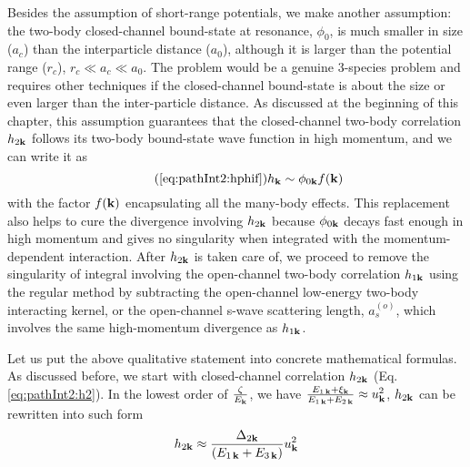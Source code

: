 Besides the assumption of short-range potentials, we make another assumption:  the  two-body closed-channel bound-state at resonance, $\phi_{0}$, is much smaller in size ($a_{c}$) than the interparticle distance ($a_{0}$), although it is  larger than the potential range ($r_{c}$),    $r_{c}\ll{}a_{c}\ll{}a_{0}$.  The problem would be a genuine 3-species problem and requires other techniques if the closed-channel bound-state is about the size  or even larger than the inter-particle distance. As discussed at the beginning of this chapter, this assumption guarantees that the closed-channel two-body correlation $h_{2\mathbf{k}}$ follows its two-body bound-state wave function in high momentum, and  we can write it as 
\begin{equation}\tag{\ref{eq:pathInt2:hphif}}
h_{\vk}\sim\phi_{0\vk}f(\vk)
\end{equation}
with the factor $f(\mathbf{k})$ encapsulating all the many-body effects. This replacement also helps to  cure the divergence involving $h_{2\mathbf{k}}$ because $\phi_{0\mathbf{k}}$ decays fast enough in high momentum and gives no singularity when integrated with the momentum-dependent interaction.   After $h_{2\mathbf{k}}$ is taken care of, we proceed to remove the singularity of integral involving the open-channel two-body correlation $h_{1\mathbf{k}}$ using the regular method by subtracting the open-channel low-energy two-body interacting kernel, or the open-channel s-wave scattering length, $a_{s}^{(o)}$, which involves  the same high-momentum divergence as $h_{1\mathbf{k}}$. 



Let us put the above qualitative statement into concrete mathematical formulas.   As discussed before, we start with  closed-channel correlation $h_{2\mathbf{k}}$ (Eq. \ref{eq:pathInt2:h2}). In the lowest order of $\frac{\zeta}{E_{\mathbf{k}}}$, we have $\frac{E_{1\,\mathbf{k}}+\xi_{\mathbf{k}}}{E_{1\,\mathbf{k}}+E_{2\,\mathbf{k}}}\approx{}u_{\mathbf{k}}^{2}$, $h_{2\mathbf{k}}$ can be rewritten into such form
\begin{equation}\label{eq:pathInt2:h2D2}
 h_{2\mathbf{k}}\approx\frac{\Delta_{2\mathbf{k}}}{(E_{1\,\mathbf{k}}+E_{3\,\mathbf{k}})}u_{\mathbf{k}}^{2}
\end{equation}

